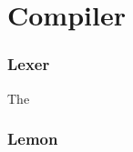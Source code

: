 \documentclass{report}
\begin{document}
\tableofcontents



\chapter{Compiler}
	\subsection{Lexer}
		The
	\subsection{Lemon}






\begin{comment}
\chapter{Interpreter}
	\subsection{Executable Format}
	Currently the executable is just code. The interpreter simply starts at the beginning of the file and starts executing.
	This file format is reaching its limits. To avoid a huge mess, an alternate file format is going to be needed. 
	\subsection{Model}
	The interpreter, rather than being register based, is stack based. I went with a stack-based mode primarily for its ease of use and ease of development. 
\end{comment}


\begin{comment}
\chapter{Model of Computation}
	The interpreter is currently equivalent to a push down automata (it may be more powerful, but I'm not sure how to prove it). However, the compiler and language are currently equivalent to a finite state machine. This is do to the grammar not providing a mechanism for modifying the computational stack.
\end{comment}
\end{document}
